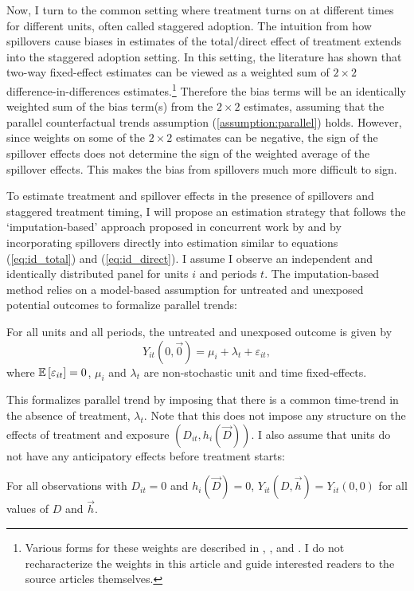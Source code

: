 \documentclass[11pt]{article}
\begin{document}
Now, I turn to the common setting where treatment turns on at different times for different units, often called staggered adoption. The intuition from how spillovers cause biases in estimates of the total/direct effect of treatment extends into the staggered adoption setting. In this setting, the literature has shown that two-way fixed-effect estimates can be viewed as a weighted sum of $2 \times 2$ difference-in-differences estimates.\footnote{Various forms for these weights are described in \citet{Goodman-Bacon_2018}, \citet{Sun_Abraham_2020}, and \citet{deChaisemartin_DHaultfoeuille_2019}. I do not recharacterize the weights in this article and guide interested readers to the source articles themselves.} Therefore the bias terms will be an identically weighted sum of the bias term(s) from the $2 \times 2$ estimates, assuming that the parallel counterfactual trends assumption (\ref{assumption:parallel}) holds. However, since weights on some of the $2 \times 2$ estimates can be negative, the sign of the spillover effects does not determine the sign of the weighted average of the spillover effects. This makes the bias from spillovers much more difficult to sign. 

To estimate treatment and spillover effects in the presence of spillovers and staggered treatment timing, I will propose an estimation strategy that follows the `imputation-based' approach proposed in concurrent work by \citet{Gardner_2021} and \citet{Borusyak_Jaravel_Spiess_2021} by incorporating spillovers directly into estimation similar to equations (\ref{eq:id_total}) and (\ref{eq:id_direct}). I assume I observe an independent and identically distributed panel for units $i$ and periods $t$. The imputation-based method relies on a model-based assumption for untreated and unexposed potential outcomes to formalize parallel trends:
\begin{assumption}\label{assumption:parallel_staggered}
    For all units and all periods, the untreated and unexposed outcome is given by
    \begin{equation}\label{eq:y0_staggered}
        Y_{it}(0, \vec{0}) = \mu_i + \lambda_t + \varepsilon_{it},
    \end{equation}
    where $\mathbb{E}\left[\varepsilon_{it}\right] = 0$, $\mu_i$ and $\lambda_t$ are non-stochastic unit and time fixed-effects.
\end{assumption}
This formalizes parallel trend by imposing that there is a common time-trend in the absence of treatment, $\lambda_t$. Note that this does not impose any structure on the effects of treatment and exposure $(D_{it}, h_i(\vec{D}))$. I also assume that units do not have any anticipatory effects before treatment starts:
\begin{assumption}\label{assumption:no-anticipation_staggered}
    For all observations with $D_{it} = 0$ and $h_i(\vec{D}) = 0$, $Y_{it}(D, \vec{h}) = Y_{it}(0,0)$ for all values of $D$ and $\vec{h}$.
\end{assumption}
\end{document}
